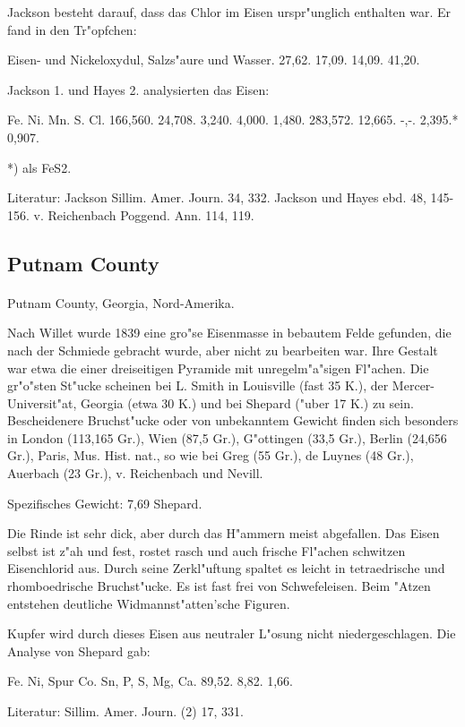 \documentclass[a4paper, 11pt, oneside]{article}
\begin{document}
Jackson besteht darauf, dass das Chlor im Eisen urspr"unglich enthalten war. Er fand in den Tr"opfchen:

Eisen- und Nickeloxydul, Salzs"aure und Wasser.  
27,62. 17,09. 14,09. 41,20.

Jackson 1. und Hayes 2. analysierten das Eisen:

Fe. Ni. Mn. S. Cl.  
1\. 66,560. 24,708. 3,240. 4,000. 1,480.  
2\. 83,572. 12,665. -,-. 2,395.* 0,907.

*) als FeS2.

Literatur: Jackson Sillim. Amer. Journ. 34, 332. Jackson und Hayes ebd. 48, 145-156. v. Reichenbach Poggend. Ann. 114, 119.

\subsection{Putnam County}
\normalsize
\paragraph{}
Putnam County, Georgia, Nord-Amerika.

Nach Willet wurde 1839 eine gro"se Eisenmasse in bebautem Felde gefunden, die nach der Schmiede gebracht wurde, aber nicht zu bearbeiten war. Ihre Gestalt war etwa die einer dreiseitigen Pyramide mit unregelm"a"sigen Fl"achen. Die gr"o"sten St"ucke scheinen bei L. Smith in Louisville (fast 35 K.), der Mercer-Universit"at, Georgia (etwa 30 K.) und bei Shepard ("uber 17 K.) zu sein. Bescheidenere Bruchst"ucke oder von unbekanntem Gewicht finden sich besonders in London (113,165 Gr.), Wien (87,5 Gr.), G"ottingen (33,5 Gr.), Berlin (24,656 Gr.), Paris, Mus. Hist. nat., so wie bei Greg (55 Gr.), de Luynes (48 Gr.), Auerbach (23 Gr.), v. Reichenbach und Nevill.

Spezifisches Gewicht: 7,69 Shepard.

Die Rinde ist sehr dick, aber durch das H"ammern meist abgefallen. Das Eisen selbst ist z"ah und fest, rostet rasch und auch frische Fl"achen schwitzen Eisenchlorid aus. Durch seine Zerkl"uftung spaltet es leicht in tetraedrische und rhomboedrische Bruchst"ucke. Es ist fast frei von Schwefeleisen. Beim "Atzen entstehen deutliche Widmannst"atten'sche Figuren.

Kupfer wird durch dieses Eisen aus neutraler L"osung nicht niedergeschlagen. Die Analyse von Shepard gab:

Fe. Ni, Spur Co. Sn, P, S, Mg, Ca.  
89,52. 8,82. 1,66.

Literatur: Sillim. Amer. Journ. (2) 17, 331.
\end{document}

